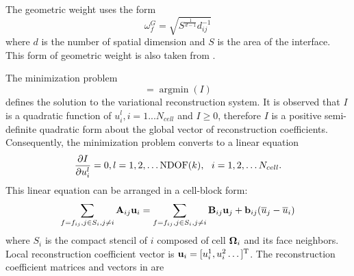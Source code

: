 The geometric weight uses the form
\begin{equation}
    \omega_f^G = \sqrt{S^{\frac{1}{d-1}}d_{ij}^{-1}}
\end{equation}
where $d$ is the number of spatial dimension and $S$ is the area of the interface.
This form of
geometric weight is also taken from \cite{huang2022high}.

The minimization problem
\begin{equation}
    [u_i^l] = \mathop{\arg \min}(I)
\end{equation}
defines the solution to the variational reconstruction system.
It is observed that $I$ is a quadratic function of $u_i^l, i = 1...N_{cell}$ and
$I\geq 0$,
therefore $I$ is a positive semi-definite quadratic form about the global vector of reconstruction
coefficients. Consequently, the minimization problem converts to a linear equation
\begin{equation}
    \partialderivative{I}{u_i^l} = 0, l=1,2,\dots \mathrm{NDOF}(k),\ \ i=1,2,\dots N_{cell} .
\end{equation}
This linear equation can be arranged in a cell-block form:
\begin{equation}
    \label{eq:vrBlockEq}
    \sum_{f=f_{ij},j\in S_i, j\neq i}{ \mathbf{A}_{ij} \mathbf{u}_i}
    =
    \sum_{f=f_{ij},j\in S_i, j\neq i}{ \mathbf{B}_{ij} \mathbf{u}_j + \mathbf{b}_{ij} (\overline{u}_j - \overline{u}_i)}
\end{equation}
where $S_i$ is the compact stencil of $i$ composed of cell $\mathbf{\Omega}_{i}$ and its face neighbors.
Local reconstruction coefficient vector is $\mathbf{u}_i = [u_i^1,u_i^2\dots]^\mathrm{T}$.
The reconstruction coefficient matrices and vectors in 
are
